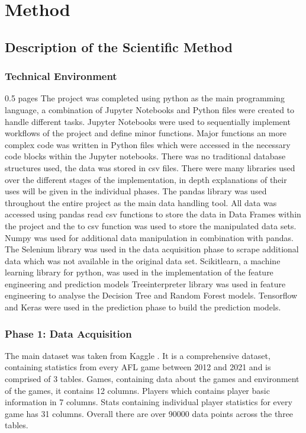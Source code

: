 \documentclass{imc-inf}
\begin{document}
	
	\chapter{Method}\label{chap:method}
	\section{Description of the Scientific Method }
	
	\subsection{Technical Environment}
	0.5 pages
	The project was completed using python as the main programming language, a combination of Jupyter Notebooks and Python files were created to handle different tasks. Jupyter Notebooks were used to sequentially implement workflows of the project and define minor functions. Major functions an more complex code was written in Python files which were accessed in the necessary code blocks within the Jupyter notebooks. There was no traditional database structures used, the data was stored in csv files. 
	There were many libraries used over the different stages of the implementation, in depth explanations of their uses will be given in the individual phases. The pandas library was used throughout the entire project as the main data handling tool. All data was accessed using pandas read csv functions to store the data in Data Frames within the project and the to csv function was used to store the manipulated data sets.
	Numpy was used for additional data manipulation in combination with pandas.  
	The Selenium library was used in the data acquisition phase to scrape additional data which was not available in the original data set.
	Scikitlearn, a machine learning library for python, was used in the implementation of the feature engineering and prediction models
	Treeinterpreter library was used in feature engineering to analyse the Decision Tree and Random Forest models.
	Tensorflow and Keras were used in the prediction phase to build the prediction models.
	
	\subsection{Phase 1: Data Acquisition}
	The main dataset was taken from Kaggle \cite{stone}. It is a comprehensive dataset, containing statistics from every AFL game between 2012 and 2021 and is comprised of 3 tables. Games, containing data about the games and environment of the games, it contains 12 columns. Players which contains player basic information in 7 columns. Stats containing individual player statistics for every game has 31 columns. Overall there are over 90000 data points across the three tables.
	
\end{document}
